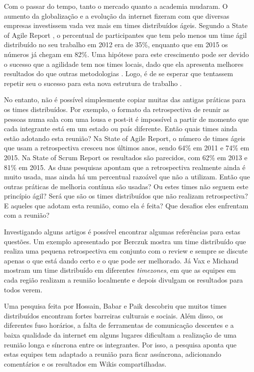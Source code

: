 \documentclass[12pt]{article}
\begin{document}
Com o passar do tempo, tanto o mercado quanto a academia mudaram. O aumento da globalização e a evolução da internet fizeram com que diversas empresas investissem vada vez mais em times distribuídos ágeis. Segundo a State of Agile Report \cite{version:12}\cite{version:15}, o percentual de participantes que tem pelo menos um time ágil distribuído no seu trabalho em 2012 era de 35\%, enquanto que em 2015 os números já chegam em 82\%. Uma hipótese para este crescimento pode ser devido o sucesso que a agilidade tem nos times locais, dado que ela apresenta melhores resultados do que outras metodologias \cite{chaos:15}. Logo, é de se esperar que tentassem repetir seu o sucesso para esta nova estrutura de trabalho \cite{gsd:09}.

No entanto, não é possível simplesmente copiar muitas das antigas práticas para os times distribuídos. Por exemplo, o formato da retrospectiva de reunir as pessoas numa sala com uma lousa e post-it é impossível a partir de momento que cada integrante está em um estado ou país diferente. Então quais times ainda estão adotando esta reunião? Na State of Agile Report, o número de times ágeis que usam a retrospectiva cresceu nos últimos anos, sendo 64\% em 2011 e 74\% em 2015. Na State of Scrum Report \cite{scrum:13}\cite{scrum:15} os resultados são parecidos, com 62\% em 2013 e 81\% em 2015. As duas pesquisas apontam que a retrospectiva realmente ainda é muito usada, mas ainda há um percentual razoável que não a utilizam. Então que outras práticas de melhoria contínua são usadas? Ou estes times não seguem este princípio ágil? Será que são os times distribuídos que não realizam retrospectiva? E aqueles que adotam esta reunião, como ela é feita? Que desafios eles enfrentam com a reunião?

Investigando alguns artigos é possível encontrar algumas referências para estas questões. Um exemplo apresentado por Berczuk \cite{berczuk:07} mostra um time distribuído que realiza uma pequena retrospectiva em conjunto com o review e sempre se discute apenas o que está dando certo e o que pode ser melhorado. Já Vax e Michaud \cite{vax:08} mostram um time distribuído em diferentes \textit{timezones}, em que as equipes em cada região realizam a reunião localmente e depois divulgam os resultados para todos verem.

Uma pesquisa feita por Hossain, Babar e Paik \cite{gsd:09} descobriu que muitos times distribuídos encontram fortes barreiras culturais e sociais. Além disso, os diferentes fuso horários, a falta de ferramentas de comunicação descentes e a baixa qualidade da internet em alguns lugares dificultam a realização de uma reunião longa e síncrona entre os integrantes. Por isso, a pesquisa aponta que estas equipes tem adaptado a reunião para ficar assíncrona, adicionando comentários e os resultados em Wikis compartilhadas. 
\end{document}
